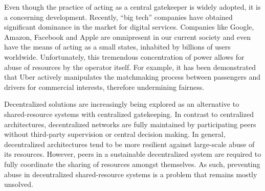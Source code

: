 Even though the practice of acting as a central gatekeeper is widely adopted, it is a concerning development.
Recently, \enquote{big tech} companies have obtained significant dominance in the market for digital services.
Companies like Google, Amazon, Facebook and Apple are omnipresent in our current society and even have the means of acting as a small states, inhabited by billions of users worldwide.
Unfortunately, this tremendous concentration of power allows for abuse of resources by the operator itself.
For example, it has been demonstrated that Uber actively manipulates the matchmaking process between passengers and drivers for commercial interests, therefore undermining fairness.



Decentralized solutions are increasingly being explored as an alternative to shared-resource systems with centralized gatekeeping.
In contrast to centralized architectures, decentralized networks are fully maintained by participating peers without third-party supervision or central decision making.
In general, decentralized architectures tend to be more resilient against large-scale abuse of its resources.
However, peers in a sustainable decentralized system are required to fully coordinate the sharing of resources amongst themselves.
As such, preventing abuse in decentralized shared-resource systems is a problem that remains mostly unsolved.

